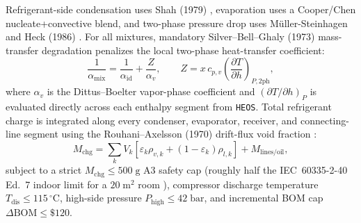 \documentclass[twocolumn,10pt]{article}
\begin{document}
Refrigerant-side condensation uses Shah (1979) \citep{shah1979condensation}, evaporation uses a Cooper/Chen nucleate+convective blend, and two-phase pressure drop uses M\"uller-Steinhagen and Heck (1986) \citep{muller1986heck}. For all mixtures, mandatory Silver--Bell--Ghaly (1973) mass-transfer degradation \citep{bell1973ghaly} penalizes the local two-phase heat-transfer coefficient:
\begin{equation}
  \frac{1}{\alpha_{\text{mix}}} = \frac{1}{\alpha_{\text{id}}} + \frac{Z}{\alpha_v}, \qquad
  Z = x\,c_{p,v}\left(\frac{\partial T}{\partial h}\right)_{P,\text{2ph}},
  \label{eq:sbg}
\end{equation}
where $\alpha_v$ is the Dittus--Boelter vapor-phase coefficient and $(\partial T/\partial h)_P$ is evaluated directly across each enthalpy segment from \texttt{HEOS}. Total refrigerant charge is integrated along every condenser, evaporator, receiver, and connecting-line segment using the Rouhani--Axelsson (1970) drift-flux void fraction \citep{rouhani1970axelsson}:
\begin{equation}
  M_{\text{chg}} = \sum_{k} V_k \left[\varepsilon_k \rho_{v,k} + (1-\varepsilon_k)\rho_{l,k}\right] + M_{\text{lines/oil}},
  \label{eq:charge}
\end{equation}
subject to a strict $M_{\text{chg}}\le 500\;\text{g}$ A3 safety cap (roughly half the IEC~60335-2-40 Ed.~7 indoor limit for a $20\;\text{m}^2$ room \citep{iec60335_2_40}), compressor discharge temperature $T_{\text{dis}}\le 115\,^\circ\text{C}$, high-side pressure $P_{\text{high}}\le 42\;\text{bar}$, and incremental BOM cap $\Delta\text{BOM}\le \$120$.
\end{document}
